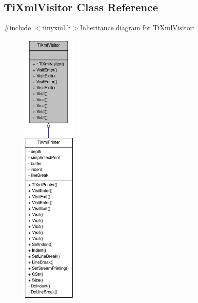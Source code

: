 \hypertarget{class_ti_xml_visitor}{
\subsection{TiXmlVisitor Class Reference}
\label{class_ti_xml_visitor}
}


{\ttfamily \#include $<$tinyxml.h$>$}Inheritance diagram for TiXmlVisitor:\nopagebreak
\begin{figure}[H]
\begin{center}
\leavevmode
\includegraphics[height=400pt]{class_ti_xml_visitor__inherit__graph}
\end{center}
\end{figure}
